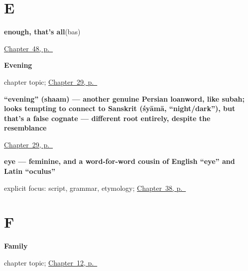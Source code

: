 \section*{E}

\noindent\begin{minipage}[t]{\linewidth}
\raggedright
\textbf{enough, that's all}\enspace\emph{}\enspace(bas)\par
\footnotesize \hyperref[ch:hi-replies]{Chapter~48, p.~\pageref*{ch:hi-replies}}
\end{minipage}\par\smallskip

\noindent\begin{minipage}[t]{\linewidth}
\raggedright
\textbf{Evening}\par
\footnotesize chapter topic; \hyperref[ch:hi-evening]{Chapter~29, p.~\pageref*{ch:hi-evening}}
\end{minipage}\par\smallskip

\noindent\begin{minipage}[t]{\linewidth}
\raggedright
\textbf{\textquotedblleft{}evening\textquotedblright{} (shaam) — another genuine Persian loanword, like subah; looks tempting to connect to Sanskrit  (śyāmā, \textquotedblleft{}night/dark\textquotedblright{}), but that's a false cognate — different root entirely, despite the resemblance}\enspace\emph{}\par
\footnotesize \hyperref[ch:hi-evening]{Chapter~29, p.~\pageref*{ch:hi-evening}}
\end{minipage}\par\smallskip

\noindent\begin{minipage}[t]{\linewidth}
\raggedright
\textbf{eye — feminine, and a word-for-word cousin of English \textquotedblleft{}eye\textquotedblright{} and Latin \textquotedblleft{}oculus\textquotedblright{}}\enspace\emph{}\par
\footnotesize explicit focus: script, grammar, etymology; \hyperref[ch:hi-where-it-hurts]{Chapter~38, p.~\pageref*{ch:hi-where-it-hurts}}
\end{minipage}\par\smallskip

\section*{F}

\noindent\begin{minipage}[t]{\linewidth}
\raggedright
\textbf{Family}\par
\footnotesize chapter topic; \hyperref[ch:hi-family]{Chapter~12, p.~\pageref*{ch:hi-family}}
\end{minipage}\par\smallskip

